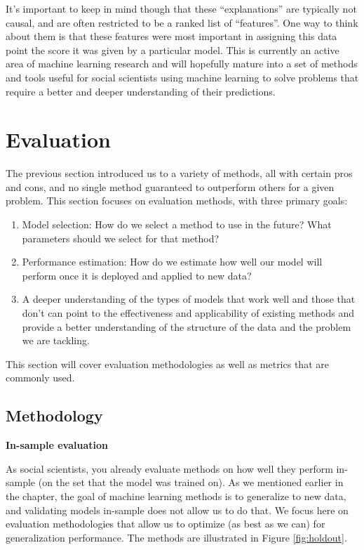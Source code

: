 \documentclass[]{krantz}
\begin{document}
It's important to keep in mind though that these ``explanations'' are
typically not causal, and are often restricted to be a ranked list of
``features''. One way to think about them is that these features were
most important in assigning this data point the score it was given by a
particular model. This is currently an active area of machine learning
research and will hopefully mature into a set of methods and tools
useful for social scientists using machine learning to solve problems
that require a better and deeper understanding of their predictions.

\section{Evaluation}\label{sec:7-7}

The previous section introduced us to a variety of methods, all with
certain pros and cons, and no single method guaranteed to outperform
others for a given problem. This section focuses on evaluation methods,
with three primary goals:

\begin{enumerate}
\def\labelenumi{\arabic{enumi}.}
\item
  Model selection: How do we select a method to use in the future? What
  parameters should we select for that method?
\item
  Performance estimation: How do we estimate how well our model will
  perform once it is deployed and applied to new data?
\item
  A deeper understanding of the types of models that work well and those
  that don't can point to the effectiveness and applicability of
  existing methods and provide a better understanding of the structure
  of the data and the problem we are tackling.
\end{enumerate}

This section will cover evaluation methodologies as well as metrics that
are commonly used.

\subsection{Methodology}\label{sec:7-7.1}

\textbf{In-sample evaluation}

As social scientists, you already evaluate methods on how well they
perform in-sample (on the set that the model was trained on). As we
mentioned earlier in the chapter, the goal of machine learning methods
is to generalize to new data, and validating models in-sample does not
allow us to do that. We focus here on evaluation methodologies that
allow us to optimize (as best as we can) for generalization performance.
The methods are illustrated in Figure \ref{fig:holdout}.
\end{document}
